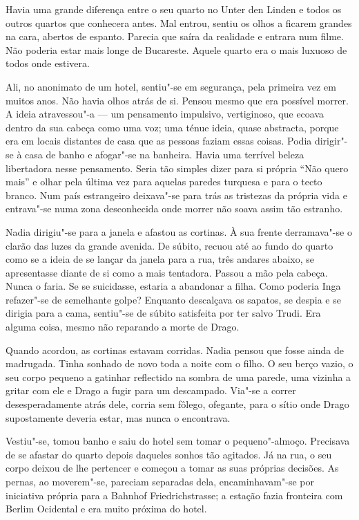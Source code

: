 Havia uma grande diferença entre o seu quarto no Unter den Linden e
todos os outros quartos que conhecera antes. Mal entrou, sentiu os olhos
a ficarem grandes na cara, abertos de espanto. Parecia que saíra da
realidade e entrara num filme. Não poderia estar mais longe de Bucareste. Aquele quarto era o mais luxuoso de todos onde estivera.

Ali, no anonimato de um hotel, sentiu"-se em segurança, pela primeira vez
em muitos anos. Não havia olhos atrás de si. Pensou mesmo que era
possível morrer. A ideia atravessou"-a --- um pensamento impulsivo,
vertiginoso, que ecoava dentro da sua cabeça como uma voz; uma ténue
ideia, quase abstracta, porque era em locais distantes de casa que as
pessoas faziam essas coisas. Podia dirigir"-se à casa de banho e
afogar"-se na banheira. Havia uma terrível beleza libertadora nesse
pensamento. Seria tão simples dizer para si própria ``Não quero mais'' e
olhar pela última vez para aquelas paredes turquesa e para o tecto
branco. Num país estrangeiro deixava"-se para trás as tristezas da
própria vida e entrava"-se numa zona desconhecida onde morrer não soava
assim tão estranho.

Nadia dirigiu"-se para a janela e afastou as cortinas. À sua frente
derramava"-se o clarão das luzes da grande avenida. De súbito, recuou até
ao fundo do quarto como se a ideia de se lançar da janela para a rua,
três andares abaixo, se apresentasse diante de si como a mais tentadora.
Passou a mão pela cabeça. Nunca o faria. Se se suicidasse, estaria a
abandonar a filha. Como poderia Inga refazer"-se de semelhante golpe?
Enquanto descalçava os sapatos, se despia e se dirigia para a cama,
sentiu"-se de súbito satisfeita por ter salvo Trudi. Era alguma coisa,
mesmo não reparando a morte de Drago.

Quando acordou, as cortinas estavam corridas. Nadia pensou que fosse
ainda de madrugada. Tinha sonhado de novo toda a noite com o filho. O
seu berço vazio, o seu corpo pequeno a gatinhar reflectido na sombra de
uma parede, uma vizinha a gritar com ele e Drago a fugir para um
descampado. Via"-se a correr desesperadamente atrás dele, corria sem
fôlego, ofegante, para o sítio onde Drago supostamente deveria estar,
mas nunca o encontrava.

Vestiu"-se, tomou banho e saiu do hotel sem tomar o pequeno"-almoço.
Precisava de se afastar do quarto depois daqueles sonhos tão agitados.
Já na rua, o seu corpo deixou de lhe pertencer e começou a tomar as
suas próprias decisões. As pernas, ao moverem"-se, pareciam separadas
dela, encaminhavam"-se por iniciativa própria para a Bahnhof
Friedrichstrasse; a estação fazia fronteira com Berlim Ocidental e era
muito próxima do hotel.


